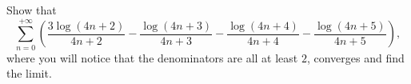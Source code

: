 \begin{problem}
    Show that
    \[
        \sum_{n=0}^{+\infty} \left(\frac{3\log\left(4n+2\right)}{4n+2}-\frac{\log\left(4n+3\right)}{4n+3}-\frac{\log\left(4n+4\right)}{4n+4}-\frac{\log\left(4n+5\right)}{4n+5}\right),
    \]
    where you will notice that the denominators are all at least \( 2 \), converges and find the limit.
\end{problem}
